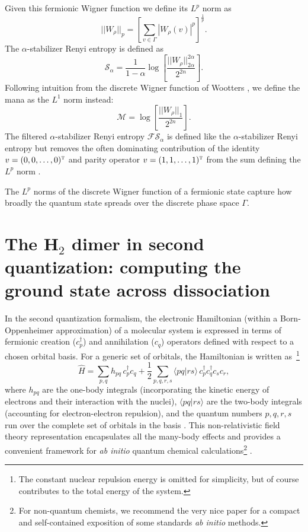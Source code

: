 \documentclass[aps, prl, twocolumn, groupedaddress, reprint, floatfix, nofootinbib, longbibliography]{revtex4-2}
\begin{document}
    Given this fermionic Wigner function we define its $L^p$ norm as
    \begin{equation}
        || W_\rho ||_p = \left[\sum_{v\in\Gamma} | W_\rho(v) |^p\right]^{\frac{1}{p}}.
    \end{equation}
    The $\alpha$-stabilizer Renyi entropy is defined as
    \begin{equation}
        \mathcal S_\alpha = \frac{1}{1-\alpha}\log\left[\frac{|| W_\rho ||_{2\alpha}^{2\alpha}}{2^{2n}}\right].
    \end{equation}
    Following intuition from the discrete Wigner function of Wootters \cite{wootters1987wigner, gibbons2004discrete}, we define the mana as the $L^1$ norm instead:
    \begin{equation}
        \mathcal M = \log\left[\frac{|| W_\rho ||_{1}}{2^{2n}}\right].
    \end{equation}
    The filtered $\alpha$-stabilizer Renyi entropy $\mathcal{FS}_\alpha$ is defined like the $\alpha$-stabilizer Renyi entropy but removes the often dominating contribution of the identity $v = (0, 0, \dots, 0)^\textsc{t}$ and parity operator $v = (1, 1, \dots, 1)^\textsc{t}$ from the sum defining the $L^{p}$ norm \cite{collura2024quantum}.

    The $L^p$ norms of the discrete Wigner function of a fermionic state capture how broadly the quantum state spreads over the discrete phase space $\Gamma$.

\section{The \texorpdfstring{H$_2$}{H2} dimer in second quantization: computing the ground state across dissociation}

    In the second quantization formalism, the electronic Hamiltonian (within a Born-Oppenheimer approximation) of a molecular system is expressed in terms of fermionic creation (\(c_p^\dagger\)) and annihilation (\(c_q\)) operators defined with respect to a chosen orbital basis. For a generic set of orbitals, the Hamiltonian is written as~\footnote{The constant nuclear repulsion energy is omitted for simplicity, but of course contributes to the total energy of the system.}
    \begin{equation}
    \hat{H} = \sum_{p,q} h_{pq}\, c_p^\dagger c_q + \frac{1}{2} \sum_{p,q,r,s} \langle pq \vert rs \rangle\, c_p^\dagger c_q^\dagger c_s c_r,
    \end{equation}
    where $h_{pq}$ are the one-body integrals (incorporating the kinetic energy of electrons and their interaction with the nuclei), $\langle pq\vert rs\rangle$ are the two-body integrals (accounting for electron-electron repulsion), and the quantum numbers $p, q, r, s$ run over the complete set of orbitals in the basis \cite{mcweeny1989method, cramer2013essentials}. This non-relativistic field theory representation encapsulates all the many-body effects and provides a convenient framework for \textit{ab initio} quantum chemical calculations\footnote{For non-quantum chemists, we recommend the very nice paper \cite{graves2023electronic} for a compact and self-contained exposition of some standards \textit{ab initio} methods.} \cite{szabo1996modern, helgaker2013molecular}.
\end{document}
